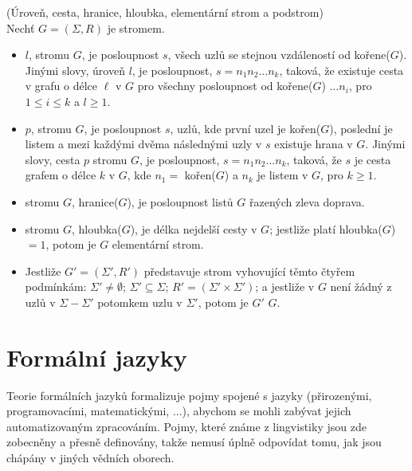 \begin{defn}
  (Úroveň, cesta, hranice, hloubka, elementární strom a podstrom)\\
  Nechť $G = (\Sigma, R)$ je stromem.
  \begin{itemize}
    \item {} $l$, stromu $G$, je posloupnost $s$,
      všech uzlů se stejnou vzdáleností od kořene($G$).
      Jinými slovy, úroveň $l$, je posloupnost, $s = n_1 n_2 ... n_k$,
      taková, že existuje cesta v grafu o délce $\ell$ v $G$
      pro všechny posloupnost od kořene($G$)
      $ ... n_i$, pro $1 \leq i \leq k$ a $l \geq 1$.

    \item {} $p$, stromu $G$, je posloupnost $s$, uzlů,
      kde první uzel je kořen($G$), poslední je listem a mezi každými
      dvěma následnými uzly v $s$ existuje hrana v $G$.
      Jinými slovy, cesta $p$ stromu $G$, je posloupnost,
      $s = n_1 n_2 ... n_k$, taková, že $s$ je cesta grafem
      o délce $k$ v $G$, kde $n_1 =$ kořen($G$) a $n_k$ je listem
      v $G$, pro $k \geq 1$.

    \item {} stromu $G$, hranice($G$),
      je posloupnost listů $G$ řazených zleva doprava.

    \item {} stromu $G$, hloubka($G$), je délka nejdelší cesty v $G$;
      jestliže platí hloubka($G$)$ = 1$, potom je $G$ elementární strom.

    \item Jestliže $G' = (\Sigma', R')$ představuje strom vyhovující těmto
      čtyřem podmínkám:
      $\Sigma' \neq \emptyset$;
      $\Sigma' \subseteq \Sigma$;
      $R' = (\Sigma' \times \Sigma')$;
      a jestliže v $G$ není žádný z uzlů v $\Sigma - \Sigma'$ potomkem
      uzlu v $\Sigma'$, potom je $G'$  $G$.
  \end{itemize}
  \vspace{-0.5cm}
\end{defn}

\chapter{Formální jazyky}
\label{chap:FormalLangs}

Teorie formálních jazyků formalizuje pojmy spojené s jazyky
(přirozenými, programovacími, matematickými, ...), abychom se mohli zabývat
jejich automatizovaným zpracováním.
Pojmy, které známe z lingvistiky jsou zde zobecněny a přesně definovány,
takže nemusí úplně odpovídat tomu, jak jsou chápány v jiných vědních oborech.


